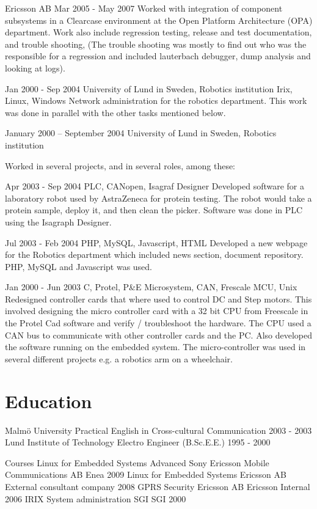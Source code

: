 \documentclass[a4paper]{article}
\begin{document}
Ericsson AB	Mar 2005 - May 2007	
Worked with integration of component subsystems in a Clearcase environment at the Open Platform Architecture (OPA) department. Work also include regression testing, release and test documentation, and trouble shooting, (The trouble shooting was mostly to find out who was the responsible for a regression and included lauterbach debugger, dump analysis and looking at logs). 

Jan 2000 - Sep 2004
University of Lund in Sweden, Robotics institution		
Irix, Linux, Windows
Network administration for the robotics department. This work was done in parallel with the other tasks mentioned below.
 

January 2000 – September 2004
University of Lund in Sweden, Robotics institution

Worked in several projects, and in several roles, among these:

Apr 2003 - Sep 2004	
PLC, CANopen, Isagraf Designer
Developed software for a laboratory robot used by AstraZeneca for protein testing. The robot would take a protein sample, deploy it, and then clean the picker. Software was done in PLC using the Isagraph Designer.
 
Jul 2003 - Feb 2004
PHP, MySQL, Javascript, HTML
Developed a new webpage for the Robotics department which included news section, document repository. PHP, MySQL and Javascript was used. 
 
Jan 2000 - Jun 2003
C, Protel, P\&E Microsystem, CAN, Frescale MCU, Unix
Redesigned  controller cards that where used to control DC and Step motors. This involved designing    the micro controller card with a 32 bit CPU from Freescale in the Protel Cad software and verify / troubleshoot the hardware. The CPU used a CAN bus to communicate with other controller cards and the PC.  Also developed the software running on the embedded system. The micro-controller was used in several different projects e.g. a robotics arm on a wheelchair.


\section{Education}

Malmö University	Practical English in Cross-cultural Communication	2003 - 2003			
Lund Institute of Technology	Electro Engineer (B.Sc.E.E.)	1995 - 2000			

Courses
Linux for Embedded Systems Advanced	Sony Ericsson Mobile Communications AB	Enea	2009		
Linux for Embedded Systems	            Ericsson AB	External consultant company	     	2008		
GPRS Security				Ericsson AB	Ericsson Internal			2006	
IRIX System administration	SGI		SGI							2000
\end{document}
